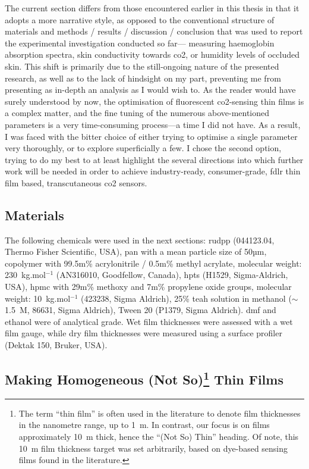 The current section differs from those encountered earlier in this thesis in that it adopts a more narrative style, as opposed to the conventional structure of materials and methods / results / discussion / conclusion that was used to report the experimental investigation conducted so far---\eg{} measuring haemoglobin absorption spectra, skin conductivity towards \gls{co2}, or humidity levels of occluded skin. This shift is primarily due to the still-ongoing nature of the presented research, as well as to the lack of hindsight on my part, preventing me from presenting as in-depth an analysis as I would wish to. As the reader would have surely understood by now, the optimisation of fluorescent \gls{co2}-sensing thin films is a complex matter, and the fine tuning of the numerous above-mentioned parameters is a very time-consuming process---a time I did not have. As a result, I was faced with the bitter choice of either trying to optimise a single parameter very thoroughly, or to explore superficially a few. I chose the second option, trying to do my best to at least highlight the several directions into which further work will be needed in order to achieve industry-ready, consumer-grade, \gls{fdlr} thin film based, transcutaneous \gls{co2} sensors.

\subsection{Materials}\label{subsect:thin_film:experimental:materials}

The following chemicals were used in the next sections: \gls{rudpp} (044123.04, Thermo Fisher Scientific, USA), \gls{pan} with a mean particle size of 50µm, copolymer with 99.5m\% acrylonitrile / 0.5m\% methyl acrylate, molecular weight: 230~kg.mol$^{-1}$ (AN316010, Goodfellow, Canada), \gls{hpts} (H1529, Sigma-Aldrich, USA), \gls{hpmc} with 29m\% methoxy and 7m\% propylene oxide groups, molecular weight: 10~kg.mol$^{-1}$ (423238, Sigma Aldrich), 25\% \gls{teah} solution in methanol ($\sim$1.5~M, 86631, Sigma Aldrich), Tween 20 (P1379, Sigma Aldrich). \gls{dmf} and ethanol were of analytical grade. Wet film thicknesses were assessed with a wet film gauge, while dry film thicknesses were measured using a surface profiler (Dektak 150, Bruker, USA).

\subsection[Making Homogeneous (Not So) Thin Films]{Making Homogeneous (Not So)\protect\footnote{The term \enquote{thin film} is often used in the literature to denote film thicknesses in the nanometre range, up to 1~\textmu{}m\cite[Sect. 523-05-02]{iec62047}. In contrast, our focus is on films approximately 10~\textmu{}m thick, hence the \enquote{(Not So) Thin} heading. Of note, this 10~\textmu{}m film thickness target was set arbitrarily, based on dye-based sensing films found in the literature\cite{amao2005b, fritzsche2017, fernandezramos2019}.} Thin Films}

